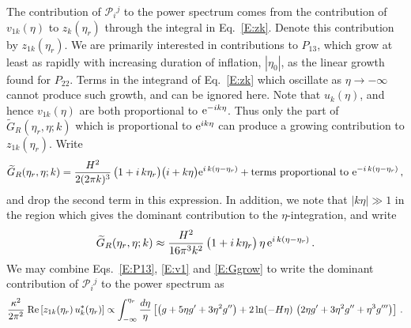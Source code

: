 \documentclass[preprint,prd,showpacs,superscriptaddress]{revtex4}
\begin{document}
The contribution of  $\mathcal{P}_{i}{}^{j}$ to the power spectrum comes from the contribution of $v_{1k}(\eta)$
to  $z_k(\eta_r)$ through the integral in Eq.~\eqref{E:zk}. Denote this contribution by  $z_{1k}(\eta_r)$. We are
primarily interested in contributions to $P_{13}$, which grow at least as rapidly with increasing duration of 
inflation, $|\eta_0|$, as the linear growth found for  $P_{22}$. Terms in the integrand of Eq.~\eqref{E:zk} which
oscillate as $\eta \rightarrow -\infty$ cannot produce such growth, and can be ignored here. Note that $u_k(\eta)$,
and hence $v_{1k}(\eta)$ are both proportional to ${\rm e}^{-i k\eta}$. Thus only the part of $\widetilde{G}_{R}(\eta_r,\eta;{k})$
which is proportional to ${\rm e}^{i k\eta}$ can produce a growing contribution to $z_{1k}(\eta_r)$. Write
\begin{equation}
	\widetilde{G}_{R}(\eta_r,\eta;{k})=
	\frac{H^{2}}{2(2\pi k)^{3}}\,\bigl(1+i\,k\eta_r\bigr)\bigl(i+k\eta\bigr) {\rm e}^{i\,k(\eta-\eta_r)}+
	\text{terms proportional to ${\rm e}^{-i\,k(\eta-\eta_r)}$}\,,
\end{equation}
and drop the second term in this expression. In addition, we note that $|k \eta| \gg 1$ in the region which gives the dominant 
contribution to the $\eta$-integration, and write
\begin{equation}\label{E:Ggrow}
	\widetilde{G}_{R}(\eta_r,\eta;{k}) \approx
	\frac{H^{2}}{16 \pi^3 k^2}\,\bigl(1+i\,k\eta_r\bigr)\, \eta\, {\rm e}^{i\,k(\eta-\eta_r)} \,.
\end{equation}
We may combine Eqs.~\eqref{E:P13}, \eqref{E:v1} and \eqref{E:Ggrow} to
write the dominant contribution of  $\mathcal{P}_{i}{}^{j}$ to the power spectrum as
\begin{equation}
\frac{\kappa^2}{2 \pi^2}\; {\rm Re} \left[ z_{1k}(\eta_r)\, u^*_k(\eta_r) \right] \propto
\int^{\eta_r}_{-\infty}  \frac{d\eta}{\eta} \left[\left(g +5\eta g' +3\eta^2 g''\right)
+2\ln(-H\eta)\, \left( 2\eta g' +3\eta^2 g'' +\eta^3 g''' \right)\right] \,. 
\end{equation} 
\end{document}
